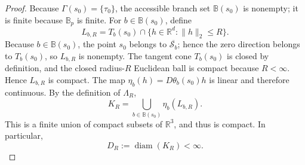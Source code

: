 \documentclass{article}
\begin{document}
\begin{proof}
Because \(\Gamma(s_0)=\{\tau_0\}\), the accessible branch set \(\mathbb B(s_0)\) is nonempty; it is finite because \(\mathbb B_p\) is finite.  For \(b\in\mathbb B(s_0)\), define
\[
 L_{b,R}=T_b(s_0)\cap\{h\in\mathbb R^d:\|h\|_2\le R\}.
\]
Because \(b\in\mathbb B(s_0)\), the point \(s_0\) belongs to \(\overline{\mathcal S_b}\); hence the zero direction belongs to \(T_b(s_0)\), so \(L_{b,R}\) is nonempty.  The tangent cone \(T_b(s_0)\) is closed by definition, and the closed radius-\(R\) Euclidean ball is compact because \(R<\infty\).  Hence \(L_{b,R}\) is compact.  The map \(\eta_b(h)=D\theta_b(s_0)h\) is linear and therefore continuous.  By the definition of \(\Lambda_R\),
\[
 K_R=\bigcup_{b\in\mathbb B(s_0)}\eta_b(L_{b,R}).
\]
This is a finite union of compact subsets of \(\mathbb R^3\), and thus is compact.  In particular,
\[
 D_R:=\operatorname{diam}(K_R)<\infty.
\tag{1}
\]


\end{proof}
\end{document}
